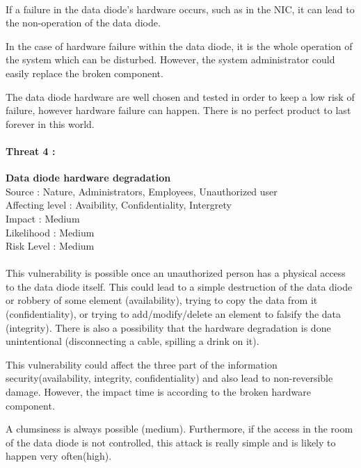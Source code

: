 \documentclass[a4paper,10pt]{article}
\begin{document}
\paragraph{}If a failure in the data diode's hardware occurs, such as in the NIC, it can lead to the non-operation of the data diode.

In the case of hardware failure within the data diode, it is the whole operation of the system which can be disturbed. However, the system administrator could easily replace the broken component.

The data diode hardware are well chosen and tested in order to keep a low risk of failure, however hardware failure can happen. There is no perfect product to last forever in this world.\\ 

\paragraph{Threat 4 :}  \textbf{Data diode hardware degradation} \\ 
Source : Nature, Administrators, Employees, Unauthorized user  \\ 
Affecting level : Avaibility, Confidentiality, Intergrety \\
Impact : Medium \\
Likelihood : Medium \\
Risk Level : Medium
\paragraph{}This vulnerability is possible once an unauthorized person has a physical access to the data diode itself. This could lead to a simple destruction of the data diode or robbery of some element (availability), trying to copy the data from it (confidentiality), or trying to add/modify/delete an element to falsify the data (integrity). There is also a possibility that the hardware degradation is done unintentional (disconnecting a cable, spilling a drink on it).

This vulnerability could affect the three part of the information security(availability, integrity, confidentiality) and also lead to non-reversible damage. However, the impact time is according to the broken hardware component. 

A clumsiness is always possible (medium). Furthermore, if the access in the room of the data diode is not controlled, this attack is really simple and is likely to happen very often(high). \\
\end{document}
